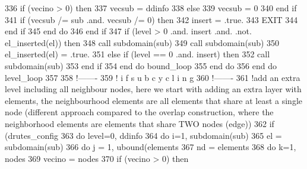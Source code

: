 \begin{DoxyCode}
336                   \textcolor{keywordflow}{if} (vecino > 0) \textcolor{keywordflow}{then}
337                     vecsub = ddinfo%
338                   \textcolor{keywordflow}{else}
339                     vecsub = 0
340 \textcolor{keywordflow}{                  end if}
341                   \textcolor{keywordflow}{if} (vecsub /= sub .and. vecsub /= 0) \textcolor{keywordflow}{then}
342                     insert = .true.
343                     \textcolor{keywordflow}{EXIT}
344 \textcolor{keywordflow}{                  end if}
345 \textcolor{keywordflow}{                end do}
346 \textcolor{keywordflow}{              end if}
347               \textcolor{keywordflow}{if} (level > 0 .and. insert .and. .not. el\_inserted(el)) \textcolor{keywordflow}{then}
348                 \textcolor{keyword}{call }subdomain(sub)%
349                 \textcolor{keyword}{call }subdomain(sub)%
350                 el\_inserted(el) = .true.
351               \textcolor{keywordflow}{else} \textcolor{keywordflow}{if} (level == 0 .and. insert) \textcolor{keywordflow}{then}
352                 \textcolor{keyword}{call }subdomain(sub)%
353 \textcolor{keywordflow}{              end if}
354 \textcolor{keywordflow}{            end do} bound\_loop
355 \textcolor{keywordflow}{          end do}
356 \textcolor{keywordflow}{        end do} level\_loop
357         
358         \textcolor{comment}{!-------}
359         \textcolor{comment}{! i f   s u b c y c l i n g }
360         \textcolor{comment}{!-------}
361         \textcolor{comment}{!add an extra level including all neighbour nodes, here we start with adding an extra layer with
       elements, the neighbourhood elements are all elements that share at least a single node (different approach
       compared to the overlap construction, where the neighborhood elements are elements that share TWO nodes
       (edge))}
362         \textcolor{keywordflow}{if} (drutes_config%
363           \textcolor{keywordflow}{do} level=0, ddinfo%
364             \textcolor{keywordflow}{do} i=1, subdomain(sub)%
365               el = subdomain(sub)%
366               \textcolor{keywordflow}{do} j = 1, ubound(elements%
367                 nd = elements%
368                 \textcolor{keywordflow}{do} k=1, nodes%
369                   vecino = nodes%
370                   \textcolor{keywordflow}{if} (vecino > 0) \textcolor{keywordflow}{then}

\end{DoxyCode}
